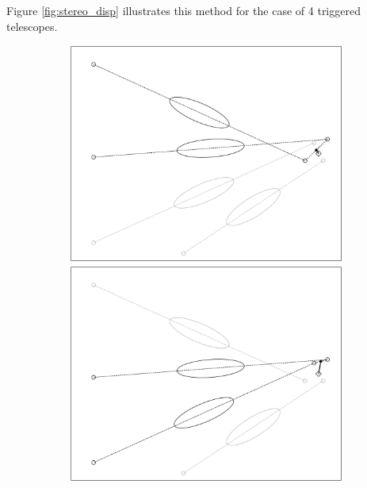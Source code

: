 Figure \ref{fig:stereo_disp} illustrates this method for the case of 4 triggered telescopes.

\begin{figure}
    \centering
    \captionsetup{width=0.9\linewidth}
    \begin{subfigure}{0.45\textwidth}
        \includegraphics[width=\linewidth]{Plots/stereo_magic_1.pdf}
        \includegraphics[width=\linewidth]{Plots/stereo_magic_2.pdf}

\end{subfigure}
\end{figure}
